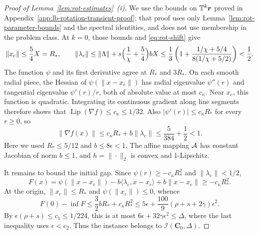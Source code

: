 \begin{proof}[Proof of Lemma~\ref{lem:rot-estimates}~(i)]
We use the bounds on \(\mathbb T^k\bm{r}\) proved in
Appendix~\ref{app:lb-rotation-transient-proof}; that proof uses only
Lemma~\ref{lem:rot-parameter-bounds} and the spectral identities, and does
not use membership in the problem class. At \(k=0\), those bounds and
\eqref{eq:rot-shift} give
\[
\|x_c\|\le\frac54X=R_*,\qquad
\|\lambda_c\|\le\|\Lambda\|+s\Bigl(\frac1\chi+\frac54\Bigr)bX
\le\frac13\left(1+\frac{1/\chi+5/4}{8(1/\chi+5/2)}\right)<\frac12.
\]
The function \(\psi\) and its first derivative agree at \(R_*\) and
\(3R_*\). On each smooth radial piece, the Hessian of
\(\psi(\|x-x_c\|)\) has radial eigenvalue \(\psi''(r)\) and tangential
eigenvalue \(\psi'(r)/r\), both of absolute value at most \(c_\kappa\).
Near \(x_c\), this function is quadratic. Integrating its continuous
gradient along line segments therefore shows that
\(\operatorname{Lip}(\nabla f)\le c_\kappa\le1/32\).
Also \(|\psi'(r)|\le c_\kappa R_*\) for every \(r\ge0\), so
\[
\|\nabla f(x)\|\le c_\kappa R_*+b\|\lambda_c\|
\le\frac5{384}+\frac12<1.
\]
Here we used \(R_*\le5/12\) and \(b\le8\epsilon<1\).
The affine mapping \(\mathcal{A}\) has constant Jacobian of norm \(b\le1\),
and \(h=\|\cdot\|_2\) is convex and 1-Lipschitz.

It remains to bound the initial gap. Since \(\psi(r)\ge-c_\kappa R_*^2\)
and \(\|\lambda_c\|<1/2\),
\[
F(x)=\psi(\|x-x_c\|)-b\langle\lambda_c,x-x_c\rangle+b\|x-x_c\|
\ge-c_\kappa R_*^2.
\]
At the origin, \(\|x_c\|\le R_*\) and \(\psi(\|x_c\|)\le0\), whence
\[
F(0)-\inf F\le\frac32bR_*+c_\kappa R_*^2
\le5\epsilon+\frac{100}{9}(\rho+s+2\gamma)\epsilon^2.
\]
By \(\epsilon(\rho+s)\le c_1\le1/224\), this is at most
\(6\epsilon+32\gamma\epsilon^2\le\Delta\), where the last inequality
uses \(\epsilon<c_2\). Thus the instance belongs to
\(\mathcal I(\mathbf C_0,\Delta)\).
\end{proof}

